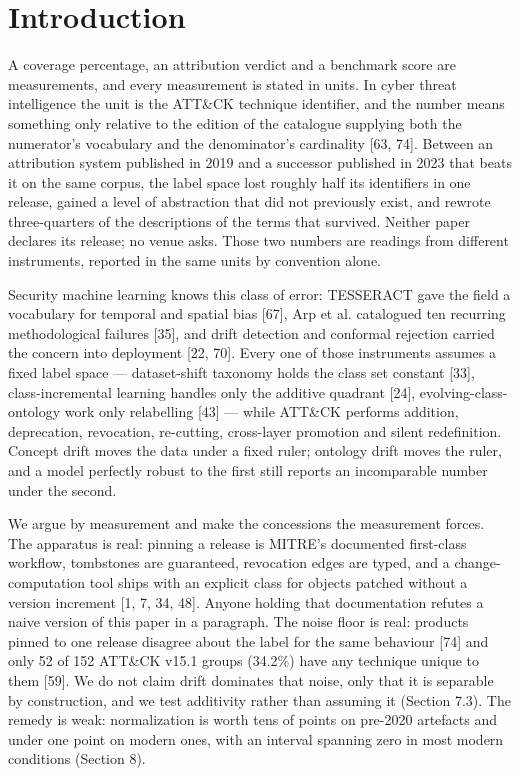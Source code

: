 \documentclass[11pt,a4paper]{article}
\begin{document}
\section{Introduction}

A coverage percentage, an attribution verdict and a benchmark score are measurements, and every measurement is stated in units. In cyber threat intelligence the unit is the ATT\&CK technique identifier, and the number means something only relative to the edition of the catalogue supplying both the numerator's vocabulary and the denominator's cardinality [63, 74]. Between an attribution system published in 2019 and a successor published in 2023 that beats it on the same corpus, the label space lost roughly half its identifiers in one release, gained a level of abstraction that did not previously exist, and rewrote three-quarters of the descriptions of the terms that survived. Neither paper declares its release; no venue asks. Those two numbers are readings from different instruments, reported in the same units by convention alone.

Security machine learning knows this class of error: TESSERACT gave the field a vocabulary for temporal and spatial bias [67], Arp et al. catalogued ten recurring methodological failures [35], and drift detection and conformal rejection carried the concern into deployment [22, 70]. Every one of those instruments assumes a fixed label space — dataset-shift taxonomy holds the class set constant [33], class-incremental learning handles only the additive quadrant [24], evolving-class-ontology work only relabelling [43] — while ATT\&CK performs addition, deprecation, revocation, re-cutting, cross-layer promotion and silent redefinition. Concept drift moves the data under a fixed ruler; ontology drift moves the ruler, and a model perfectly robust to the first still reports an incomparable number under the second.

We argue by measurement and make the concessions the measurement forces. The apparatus is real: pinning a release is MITRE's documented first-class workflow, tombstones are guaranteed, revocation edges are typed, and a change-computation tool ships with an explicit class for objects patched without a version increment [1, 7, 34, 48]. Anyone holding that documentation refutes a naive version of this paper in a paragraph. The noise floor is real: products pinned to one release disagree about the label for the same behaviour [74] and only 52 of 152 ATT\&CK v15.1 groups (34.2\%) have any technique unique to them [59]. We do not claim drift dominates that noise, only that it is separable by construction, and we test additivity rather than assuming it (Section 7.3). The remedy is weak: normalization is worth tens of points on pre-2020 artefacts and under one point on modern ones, with an interval spanning zero in most modern conditions (Section 8).
\end{document}
